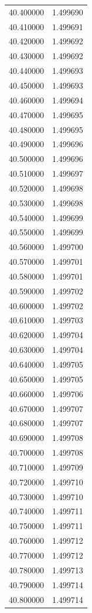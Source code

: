 \begin{tabular}{rr}
40.400000 & 1.499690 \\
40.410000 & 1.499691 \\
40.420000 & 1.499692 \\
40.430000 & 1.499692 \\
40.440000 & 1.499693 \\
40.450000 & 1.499693 \\
40.460000 & 1.499694 \\
40.470000 & 1.499695 \\
40.480000 & 1.499695 \\
40.490000 & 1.499696 \\
40.500000 & 1.499696 \\
40.510000 & 1.499697 \\
40.520000 & 1.499698 \\
40.530000 & 1.499698 \\
40.540000 & 1.499699 \\
40.550000 & 1.499699 \\
40.560000 & 1.499700 \\
40.570000 & 1.499701 \\
40.580000 & 1.499701 \\
40.590000 & 1.499702 \\
40.600000 & 1.499702 \\
40.610000 & 1.499703 \\
40.620000 & 1.499704 \\
40.630000 & 1.499704 \\
40.640000 & 1.499705 \\
40.650000 & 1.499705 \\
40.660000 & 1.499706 \\
40.670000 & 1.499707 \\
40.680000 & 1.499707 \\
40.690000 & 1.499708 \\
40.700000 & 1.499708 \\
40.710000 & 1.499709 \\
40.720000 & 1.499710 \\
40.730000 & 1.499710 \\
40.740000 & 1.499711 \\
40.750000 & 1.499711 \\
40.760000 & 1.499712 \\
40.770000 & 1.499712 \\
40.780000 & 1.499713 \\
40.790000 & 1.499714 \\
40.800000 & 1.499714 \\

\end{tabular}
